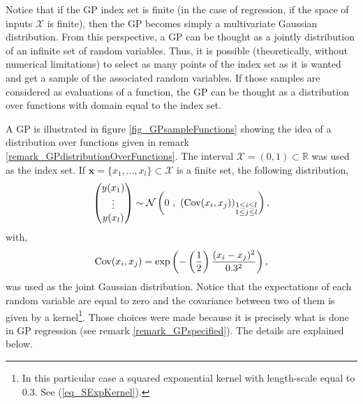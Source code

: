 \begin{remark} \label{remark_GPdistributionOverFunctions}
  Notice that if the GP index set is finite (in the case of regression, if the space of inputs $\mathcal{X}$ is finite), then the GP becomes simply a multivariate Gaussian distribution. From this perspective, a GP can be thought as a jointly distribution of an infinite set of random variables. Thus, it is possible (theoretically, without numerical limitations) to select as many points of the index set as it is wanted and get a sample of the associated random variables. If those samples are considered as evaluations of a function, the GP can be thought as a distribution over functions with domain equal to the index set.
\end{remark}

A GP is illustrated in figure \ref{fig_GPsampleFunctions} showing the idea of a distribution over functions given in remark \ref{remark_GPdistributionOverFunctions}. The interval $\mathcal{X} = (0,1) \subset \mathbb{R}$ was used as the index set. If $\pmb{x} = \{x_1, \dots, x_l\} \subset \mathcal{X}$ is a finite set, the following distribution,
\begin{equation} \label{eq_GPsampleFunctionsFigure}
  \begin{pmatrix} y(x_1) \\ \vdots \\ y(x_l) \end{pmatrix} \sim
  \mathcal{N} \left( 0 \ , \ \left( \textup{Cov}(x_i,x_j) \right)_{\substack{1 \leq i \leq l \\ 1 \leq j \leq l}} \right), 
\end{equation}
with,
\begin{equation} \label{eq_covGPsampleFunctionsFigure}
  \textup{Cov}(x_i,x_j) = \exp \left( 
                         -\left( \frac{1}{2} \right) \frac{(x_i-x_j)^2}{0.3^2} 
                          \right),
\end{equation} 
was used as the joint Gaussian distribution. Notice that the expectations of each random variable are equal to zero and the covariance between two of them is given by a kernel\footnote{In this particular case a squared exponential kernel with length-scale equal to $0.3$. See (\ref{eq_SExpKernel}).}. Those choices were made because it is precisely what is done in GP regression (see remark \ref{remark_GPspecified}). The details are explained below.

